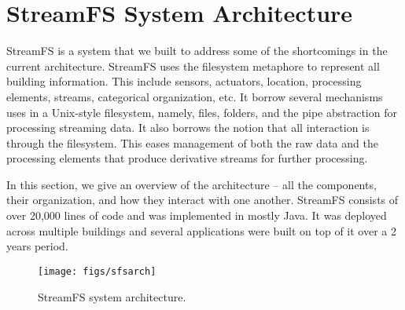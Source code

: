 \chapter{StreamFS System Architecture}
\label{chap:SFSArchMain}

StreamFS is a system that we built to address some of the shortcomings in the current architecture.  StreamFS uses the filesystem
metaphore to represent all building information.  This include sensors, actuators, location, processing elements, 
streams, categorical organization, etc.  It borrow several mechanisms uses in a Unix-style filesystem, namely, files, folders,
and the pipe abstraction for processing streaming data.  It also borrows the notion that all interaction is through the filesystem.
This eases management of both the raw data and the processing elements that produce derivative streams for further processing.

In this section, we give an overview of the architecture -- all the components, their organization, and how they interact with one
another.  StreamFS consists of over 20,000 lines of code and was implemented in mostly Java.  It was deployed across multiple
buildings and several applications were built on top of it over a 2 years period.







\begin{figure}[t!] %
\centering
\texttt{[image: figs/sfsarch]}
\caption{StreamFS system architecture.}
\label{fig:sfsarch}
\end{figure}






